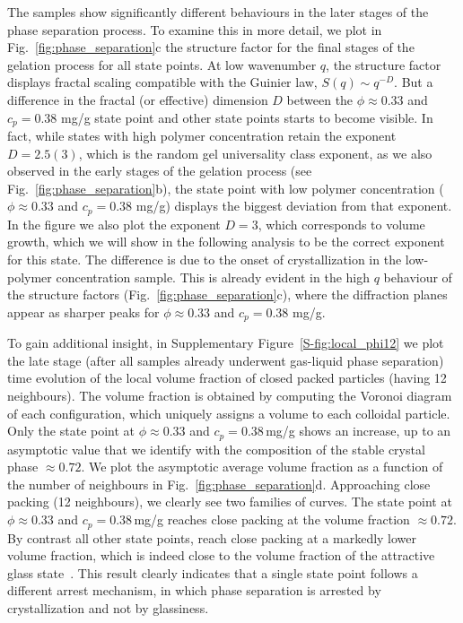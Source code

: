 \documentclass[preprint,amsmath,amssymb,superscriptaddress]{revtex4-1}
\begin{document}
The samples show significantly different behaviours in the later stages of the phase separation process.
To examine this in more detail, we plot in Fig.~\ref{fig:phase_separation}c the structure factor for the final stages of the gelation process for all state points.
At low wavenumber $q$, the structure factor displays fractal scaling compatible with the Guinier law, $S(q)\sim q^{-D}$.
But a difference in the fractal (or effective) dimension $D$ between the $\phi\approx 0.33$ and $c_p=0.38$ mg/g state point and other state points starts to become visible. In fact, while states
with high polymer concentration retain the exponent $D=2.5(3)$, 
which is the random gel universality class exponent, as we also observed in the early stages of the gelation process (see Fig.~\ref{fig:phase_separation}b),
the state point with low polymer concentration ($\phi\approx 0.33$ and $c_p=0.38$ mg/g) displays the biggest deviation from that exponent. In the figure we also
plot the exponent $D=3$, which corresponds to volume growth, which we will show in the following analysis to be the correct exponent for this state. 
The difference is due to the onset of crystallization in the low-polymer concentration sample. This is already evident in the high $q$ behaviour of
the structure factors (Fig.~\ref{fig:phase_separation}c), where the diffraction planes appear as sharper peaks for $\phi\approx 0.33$ and $c_p=0.38$ mg/g.

To gain additional insight, in Supplementary Figure~\ref{S-fig:local_phi12} we plot the late stage (after all samples already underwent gas-liquid phase separation) time evolution of the local volume fraction of closed packed particles (having 12 neighbours). The volume fraction is obtained by computing the Voronoi diagram of each configuration, which uniquely assigns a volume to each colloidal particle. Only the state point at $\phi\approx 0.33$ and $c_p = 0.38\,$mg/g shows an increase, up to an asymptotic value that we identify with the composition of the stable crystal phase $\approx 0.72$. We plot the asymptotic average volume fraction as a function of the number of neighbours in Fig.~\ref{fig:phase_separation}d. Approaching close packing (12 neighbours), we clearly see two families of curves. The state point at $\phi\approx 0.33$ and $c_p=0.38\,$mg/g reaches close packing at the volume fraction $\approx 0.72$. By contrast all other state points, reach close packing at a markedly 
lower volume fraction, which is indeed close to the volume fraction of the attractive glass state~\cite{pham2002multiple}. This result clearly indicates that a single state point follows a different arrest mechanism, in which phase separation is arrested by crystallization and not by glassiness.
\end{document}

